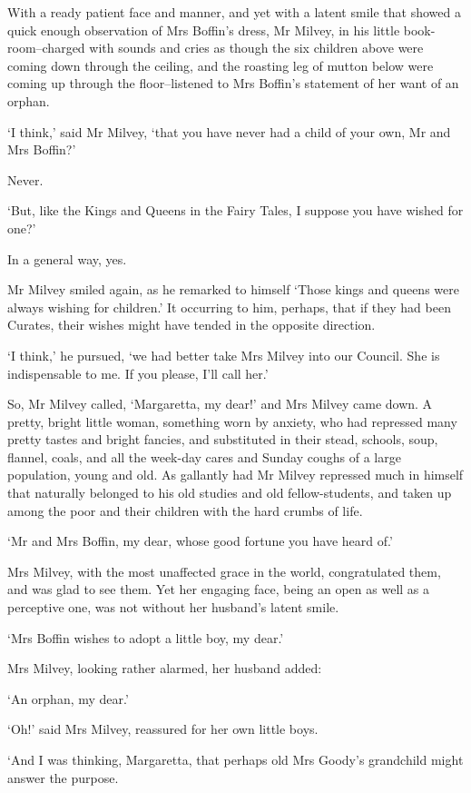 With a ready patient face and manner, and yet with a latent smile that
showed a quick enough observation of Mrs Boffin’s dress, Mr Milvey, in
his little book-room--charged with sounds and cries as though the six
children above were coming down through the ceiling, and the roasting
leg of mutton below were coming up through the floor--listened to Mrs
Boffin’s statement of her want of an orphan.

‘I think,’ said Mr Milvey, ‘that you have never had a child of your own,
Mr and Mrs Boffin?’

Never.

‘But, like the Kings and Queens in the Fairy Tales, I suppose you have
wished for one?’

In a general way, yes.

Mr Milvey smiled again, as he remarked to himself ‘Those kings and
queens were always wishing for children.’ It occurring to him, perhaps,
that if they had been Curates, their wishes might have tended in the
opposite direction.

‘I think,’ he pursued, ‘we had better take Mrs Milvey into our Council.
She is indispensable to me. If you please, I’ll call her.’

So, Mr Milvey called, ‘Margaretta, my dear!’ and Mrs Milvey came down.
A pretty, bright little woman, something worn by anxiety, who had
repressed many pretty tastes and bright fancies, and substituted in
their stead, schools, soup, flannel, coals, and all the week-day cares
and Sunday coughs of a large population, young and old. As gallantly had
Mr Milvey repressed much in himself that naturally belonged to his old
studies and old fellow-students, and taken up among the poor and their
children with the hard crumbs of life.

‘Mr and Mrs Boffin, my dear, whose good fortune you have heard of.’

Mrs Milvey, with the most unaffected grace in the world, congratulated
them, and was glad to see them. Yet her engaging face, being an open as
well as a perceptive one, was not without her husband’s latent smile.

‘Mrs Boffin wishes to adopt a little boy, my dear.’

Mrs Milvey, looking rather alarmed, her husband added:

‘An orphan, my dear.’

‘Oh!’ said Mrs Milvey, reassured for her own little boys.

‘And I was thinking, Margaretta, that perhaps old Mrs Goody’s grandchild
might answer the purpose.

